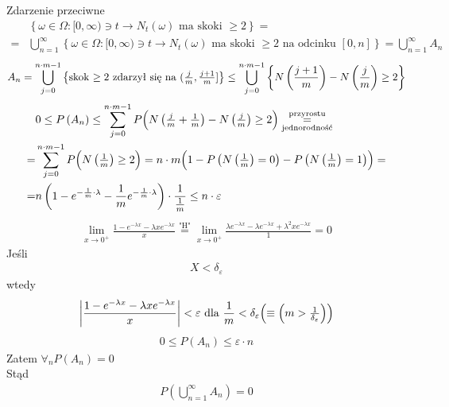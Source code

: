 Zdarzenie przeciwne
\begin{align*}
&\left\{\omega\in\Omega:[0,\infty )\ni t\to N_t(\omega)\text{ ma skoki }\ge 2\right\}
=\\=&
\bigcup_{n=1}^\infty \left\{\omega\in\Omega:[0,\infty )\ni t\to N_t(\omega)\text{ ma skoki }\ge 2\text{ na odcinku }[0,n]\right\}=
\bigcup_{n=1}^\infty A_n
\end{align*}
\begin{gather*}
A_n=\bigcup_{j=0}^{n\cdot m-1}
\left\{\text{skok $ \ge 2 $ zdarzył się na }(\tfrac{j}{m},\tfrac{j+1}{m}]\right\}\le
\bigcup_{j=0}^{n\cdot m-1}
\left\{N\left(\frac{j+1}{m}\right)-N\left(\frac{j}{m}\right)\ge 2\right\}
\end{gather*}
\begin{align*}
&0\le P\left(A_n\right)\le
\sum_{j=0}^{n\cdot m -1}P\Bigl(N\left(\tfrac{j}{m}+\tfrac{1}{m}\right)-N\left(\tfrac{j}{m}\right)\ge 2\Bigr)
\underset{\text{jednorodność}}{\stackrel{\text{\text{przyrostu}}}{=}}\\
=
&\sum_{j=0}^{n\cdot m -1}
P\Bigl(N\left(\tfrac{1}{m}\right)\ge 2\Bigr)
=
n\cdot m\Bigl(1-P\left(N\left(\tfrac{1}{m}\right)=0\right)-P\left(N\left(\tfrac{1}{m}\right)=1\right)\Bigr)
=\\=&
n\left(1-e^{-\frac{1}{m}\cdot\lambda}-\frac{1}{m}e^{-\frac{1}{m}\cdot\lambda}\right)\cdot \frac{1}{\frac{1}{m}}
\le n\cdot\varepsilon
\end{align*}
\begin{gather*}
\lim\limits_{x\to0^+}
\frac{1-e^{-\lambda x}-\lambda xe^{-\lambda x}}{x}
\stackrel{\text{"H"}}{=}
\lim\limits_{x\to0^+}
\frac{\lambda e^{-\lambda  x}-\lambda e^{-\lambda  x}+\lambda ^2 x e^{-\lambda  x}}{1}=0
\end{gather*}
Jeśli
\begin{gather*}
X<\delta_\varepsilon
\end{gather*}
wtedy
\begin{gather*}
\left|\frac{1-e^{-\lambda x}-\lambda xe^{-\lambda x}}{x}\right|<\varepsilon
\text{ dla }\frac{1}{m}<\delta_\varepsilon\Bigl(\equiv\left(m>\tfrac{1}{\delta_\varepsilon}\right)\Bigr)
\end{gather*}
\begin{gather*}
0\le P\left(A_n\right)\le\varepsilon\cdot n
\end{gather*}
Zatem $ \forall_n P\left(A_n\right)=0 $\\
Stąd \begin{gather*}
P\left(\bigcup_{n=1}^\infty A_n\right)=0
\end{gather*}
